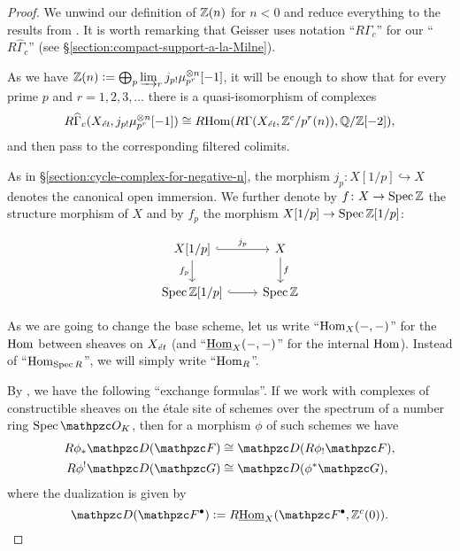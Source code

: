 \begin{proof}
  We unwind our definition of $\mathbb{Z} (n)$ for $n < 0$ and reduce everything to the
  results from \cite{Geisser-10}. It is worth remarking that Geisser uses
  notation ``$R\Gamma_c$'' for our ``$R\widehat{\Gamma}_c$''
  (see \S\ref{section:compact-support-a-la-Milne}).

  \vspace{1em}

  As we have
  $\mathbb{Z} (n) \mathrel{\mathop:}= \bigoplus_p \varinjlim_r j_{p!} \mu_{p^r}^{\otimes n} [-1]$, it
  will be enough to show that for every prime $p$ and $r=1,2,3,\ldots$ there is
  a quasi-isomorphism of complexes
  \[ R\widehat{\Gamma}_c (X_\text{\it ét}, j_{p!} \mu_{p^r}^{\otimes n} [-1]) \cong
    R\!\operatorname{Hom} (R\Gamma (X_\text{\it ét}, \mathbb{Z}^c/p^r (n)), \mathbb{Q}/\mathbb{Z} [-2]), \]
  and then pass to the corresponding filtered colimits.

  As in \S\ref{section:cycle-complex-for-negative-n}, the morphism
  $j_p\colon X[1/p] \hookrightarrow X$ denotes the canonical open immersion.
  We further denote by $f\colon X\to \operatorname{Spec} \mathbb{Z}$ the structure morphism of $X$
  and by $f_p$ the morphism $X [1/p] \to \operatorname{Spec} \mathbb{Z} [1/p]$:

  \[ \begin{tikzcd}
      X [1/p]\ar[hookrightarrow]{r}{j_p}\ar{d}[swap]{f_p} & X\ar{d}{f} \\
      \Spec \ZZ [1/p]\ar[hookrightarrow]{r} & \Spec \ZZ
    \end{tikzcd} \]

  As we are going to change the base scheme, let us write ``$\operatorname{Hom}_X (-,-)$''
  for the $\operatorname{Hom}$ between sheaves on $X_\text{\it ét}$ (and ``$\underline{\operatorname{Hom}}_X (-,-)$''
  for the internal $\operatorname{Hom}$). Instead of ``$\operatorname{Hom}_{\operatorname{Spec} R}$'', we will simply
  write ``$\operatorname{Hom}_R$''.

  By \cite[Proposition 7.10, (c)]{Geisser-10}, we have the following
  ``exchange formulas''. If we work with complexes of constructible sheaves on
  the étale site of schemes over the spectrum of a number ring $\Spec \O_K$,
  then for a morphism $\phi$ of such schemes we have
  \begin{align}
    \label{eqn:exchange-formua-1} R \phi_* \mathcal{D} (\mathcal{F}) & \isom \mathcal{D} (R \phi_! \mathcal{F}),\\
    \label{eqn:exchange-formua-2} R \phi^! \mathcal{D} (\mathcal{G}) & \isom \mathcal{D} (\phi^* \mathcal{G}),
  \end{align}
  where the dualization is given by
  $$\mathcal{D} (\mathcal{F}^\bullet) \dfn R\iHom_X (\mathcal{F}^\bullet, \ZZ^c (0)).$$


\end{proof}
